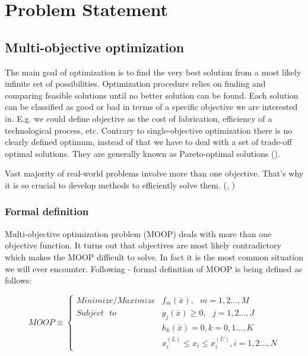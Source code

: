 \chapter{Problem Statement}
\label{cha:multiObjectiveOptimization}




\section{Multi-objective optimization}
\label{sec:multi}

The main goal of optimization is to find the very best solution from a most likely infinite set of possibilities.
Optimization procedure relies on finding and comparing feasible solutions until no better solution can be found.
Each solution can be classified as good or bad in terms of a specific objective we are interested in.
E.g. we could define objective as the cost of fabrication, efficiency of a technological process, etc.
Contrary to single-objective optimization there is no clearly defined optimum, instead of that we have to deal with a set of trade-off optimal solutions.
They are generally known as Pareto-optimal solutions (\cite{Phd}).

Vast majority of real-world problems involve more than one objective.
That's why it is so crucial to develop methods to efficiently solve them.
(\cite{Phd}, \cite{Deb:2001:MOU:559152})

\subsection{Formal definition}

Multi-objective optimization problem (MOOP) deals with more than one objective function.
It turns out that objectives are most likely contradictory which makes the MOOP difficult to solve.
In fact it is the most common situation we will ever encounter. 
Following \cite{Deb:2001:MOU:559152} - formal definition of MOOP is being defined as follows:

\begin{equation} 
MOOP \equiv
 \begin{cases}
     Minimize/Maximize  & f_{m}(\bar{x}), \text{ } m = 1,2...,M \\
     Subject \text{ } to  &  g_{j}(\bar{x}) \geq 0, \text{ } j = 1,2..., J  \\ 
			  &  h_{k}(\bar{x}) = 0, k = 0,1...,K \\
			  &  x_{i}^{(L)} \leq x_{i} \leq x_{i}^{(U)}, i = 1,2...,N
      
\end{cases}  
\end{equation}

